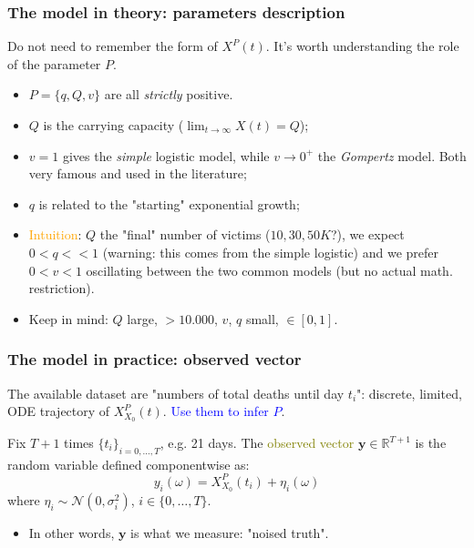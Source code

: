 \documentclass{beamer}
\begin{document}
\begin{frame}
	\frametitle{The model in theory: parameters description}
	Do not need to remember the form of $X^P(t)$. It's worth 
	understanding the role of the parameter $P$.
	\begin{itemize}
		\item $P = \{ q, Q, v \}$ are all \emph{strictly} positive.
		\item <2->$Q$ is the carrying capacity 
			($\lim_{t \to \infty} X(t) = Q$);
		\item <3-> $v =1$ gives the \emph{simple} logistic model,
			while $v \to 0^{+}$ the \emph{Gompertz} model. Both
			very famous and used in the literature;
		\item <5-> $q$ is related to the "starting" exponential
			growth;
	\end{itemize}

	\begin{itemize}
		\item<6->
			\textcolor{orange}{Intuition}: 
			$Q$ the "final" number of victims
	($10, 30, 50K$?), we expect $0 < q << 1$
	(warning: this comes from the simple logistic)
	and we prefer
	$0 < v < 1$ oscillating between the two common models
	(but no actual math. restriction).

\item<7-> Keep in mind: 
	$Q$ large, $>10.000$, $v$, $q$ small, $\in [0,1]$.
	\end{itemize}

\end{frame}

\begin{frame}
	\frametitle{The model in practice: observed vector}
	The available dataset are "numbers of total deaths until day $t_i$":
	discrete, limited, ODE trajectory of $X^P_{X_0}(t)$.
	\textcolor{blue}{Use them to infer $P$}.

	\begin{block}{}
	Fix $T+1$ times $\{t_i\}_{i = 0,\dots, T}$, e.g. 21 days.
		The \textcolor{olive}{observed vector} 
		$\textbf{y} \in \mathbb{R}^{T+1}$
        is the random variable defined componentwise as:
	\begin{equation}
        	y_i(\omega) = X^P_{X_0} (t_i) + \eta_i(\omega)
	\end{equation}
		where $\eta_i \sim \mathcal{N}(0, \sigma^2_i)$, $i \in \{0,
		\dots,T\}$.
	\end{block}

	\begin{itemize}
		\item<2->
	In other words, $\textbf{y}$ is what we measure: "noised truth".
	\end{itemize}
\end{frame}
\end{document}
